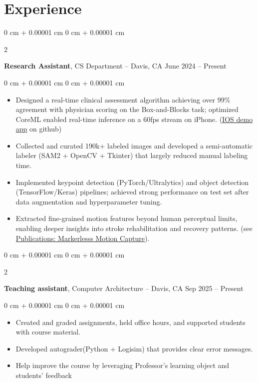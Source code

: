 \documentclass[10pt, letterpaper]{article}
\newenvironment{highlights}{
    \begin{itemize}[
        topsep=0.10 cm,
        parsep=0.10 cm,
        partopsep=0pt,
        itemsep=0pt,
        leftmargin=0 cm + 10pt
    ]
}{
    \end{itemize}
} %
\newenvironment{onecolentry}{
    \begin{adjustwidth}{
        0 cm + 0.00001 cm
    }{
        0 cm + 0.00001 cm
    }
}{
    \end{adjustwidth}
} %
\newenvironment{twocolentry}[2][]{
    \onecolentry
    \def\secondColumn{#2}
    \setcolumnwidth{\fill, 6 cm}
    \begin{paracol}{2}
}{
    \switchcolumn \raggedleft \secondColumn
    \end{paracol}
    \endonecolentry
} %
\begin{document}
    
    \section{Experience}



        
        \begin{twocolentry}{
            June 2024 – Present
        }
            \textbf{Research Assistant}, CS Department -- Davis, CA\end{twocolentry}

        \vspace{0.10 cm}
        \begin{onecolentry}
            \begin{highlights}
                \item Designed a real-time clinical assessment algorithm achieving over 99\% agreement with physician scoring on the Box-and-Blocks task; optimized CoreML enabled real-time inference on a 60fps stream on iPhone. (\href{https://github.com/AlundorZhu/CMORE-app}{IOS demo app} on github)
                \item Collected and curated 190k+ labeled images and developed a semi-automatic labeler (SAM2 + OpenCV + Tkinter) that largely reduced manual labeling time.
                \item Implemented keypoint detection (PyTorch/Ultralytics) and object detection (TensorFlow/Keras) pipelines; achieved strong performance on test set after data augmentation and hyperparameter tuning.
                \item Extracted fine-grained motion features beyond human perceptual limits, enabling deeper insights into stroke rehabilitation and recovery patterns. (see \hyperref[pub:markerless-motion-capture]{Publications: Markerlesss Motion Capture}). 
            \end{highlights}
        \end{onecolentry}

        \vspace{0.2 cm}

        \begin{twocolentry}{
            Sep 2025 – Present
        }
            \textbf{Teaching assistant}, Computer Architecture -- Davis, CA\end{twocolentry}

        \vspace{0.10 cm}
        \begin{onecolentry}
            \begin{highlights}
                \item Created and graded assignments, held office hours, and supported students with course material.
                \item Developed autograder(Python + Logisim) that provides clear error messages.
                \item Help improve the course by leveraging Professor's learning object and students' feedback

            \end{highlights}
        \end{onecolentry}
\end{document}
